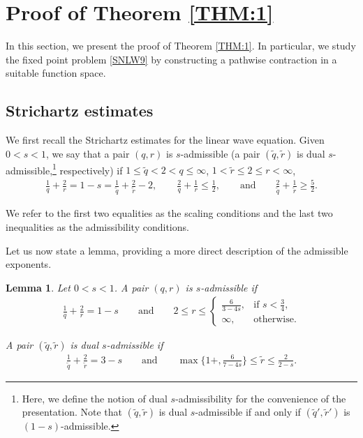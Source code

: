\documentclass[letterpaper, 11pt,  reqno]{amsart}
\newtheorem{lemma}[theorem]{Lemma}
\newcommand{\1}{\hspace{0.5mm}\text{I}\hspace{0.5mm}}
\newcommand{\noi}{\noindent}
\newcommand{\wt}{\widetilde}
\numberwithin{equation}{section}
\numberwithin{theorem}{section}
\begin{document}
\section{Proof of Theorem \ref{THM:1}}
\label{SEC:3}


In this section, we present the proof of Theorem \ref{THM:1}.
In particular, we study the fixed point problem
\eqref{SNLW9}
by constructing a pathwise contraction
in a suitable function space.


\subsection{Strichartz estimates}
\label{SUBSEC:3.1}

We first recall the Strichartz estimates
for the  linear wave equation.
Given  $0 < s < 1$, 
we say that a pair $(q, r)$ is $s$-admissible 
(a pair $(\wt q, \wt r)$ is dual $s$-admissible,\footnote{Here, we define
the notion of dual $s$-admissibility for the convenience of the presentation.
Note that $(\wt q, \wt r)$ is dual $s$-admissible
if and only if $(\wt q', \wt r')$ is $(1-s)$-admissible.}
 respectively)
if $1 \leq \wt q < 2 < q \leq \infty$, 
 $1< \wt r \le 2 \leq r < \infty$, 
\begin{align}
 \frac{1}{q} + \frac 2r  = 1-  s =  \frac1{\wt q}+ \frac2{\wt r} -2, 
\qquad
\frac 2q + \frac{1}{r} \leq \frac 1 2, 
\qquad \text{and} 
\qquad  
\frac2{\wt q}+\frac1{\wt r} \geq \frac52   .
\label{admis1}
\end{align}

\noi
We refer to the first two equalities as the scaling conditions
and the last two inequalities as the admissibility conditions.

Let us now state a lemma, providing a more direct description of the admissible exponents.

\begin{lemma} \label{LEM:pair} 
Let $0< s<1$.
A pair $(q,r)$ is $s$-admissible if 
\begin{align}
  \frac{1}{q} + \frac 2r  = 1-  s 
\qquad  
\text{and} \qquad
2\le r \le 
\begin{cases}
 \frac6{3-4s}, & \text{if } s < \frac34, \\ 
\infty, & \text{otherwise}. 
\end{cases}
\label{admis2}
\end{align}


\noi
A pair $(\wt  q,\wt  r)$ is dual $s$-admissible if 
\begin{align} 
\frac1{\wt q} + \frac2{\wt r} = 3 - s 
\qquad  
\text{and} \qquad
\max\bigg\{1+, \frac6{7-4s} \bigg\}  \le   \wt r \le \frac2{2-s}. 
\label{admis3}
\end{align}



\end{lemma} 
\end{document}

